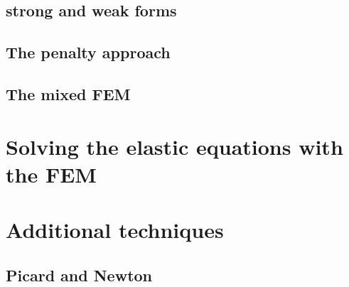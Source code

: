 \documentclass[a4paper]{article}
\begin{document}
\subsection{strong and weak forms}  %

\subsection{The penalty approach}  %

\subsection{The mixed FEM}  %



\newpage
\section{Solving the elastic equations with the FEM}









\newpage
\section{Additional techniques} %

\subsection{Picard and Newton}
\end{document}
